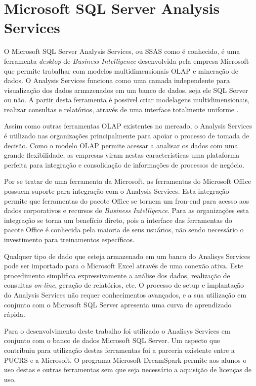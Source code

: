 \section{Microsoft SQL Server Analysis Services}
O Microsoft SQL Server Analysis Services, ou SSAS como é conhecido, é uma ferramenta \emph{desktop} de \emph{Business Intelligence} desenvolvida pela empresa Microsoft que permite trabalhar com modelos multidimensionais OLAP e mineração de dados. O Analysis Services funciona como uma camada independente para visualização dos dados armazenados em um banco de dados, seja ele SQL Server ou não. A partir desta ferramenta é possivel criar modelagens multidimensionais, realizar consultas e relatórios, através de uma interface totalmente uniforme \cite{MIC13}.

Assim como outras ferramentas OLAP existentes no mercado, o Analysis Services é utilizado nas organizações principalmente para apoiar o processo de tomada de decisão. Como o modelo OLAP permite acessar a analisar os dados com uma grande flexibilidade, as empresas viram nestas características uma plataforma perfeita para integração e consolidação de informações de processos de negócio.

Por se tratar de uma ferramenta da Microsoft, as ferramentas do Microsoft Office possuem suporte para integração com o Analysis Services. Esta integração permite que ferramentas do pacote Office se tornem um fron-end para acesso aos dados corporativos e recursos de \emph{Business Intelligence}. Para as organizações esta integração se torna um benefício direto, pois a interface das ferramentas do pacote Office é conhecida pela maioria de seus usuários, não sendo necessário o investimento para treinamentos específicos.

Qualquer tipo de dado que esteja armazenado em um banco do Analisys Services pode ser importado para o Microsoft Excel através de uma conexão ativa. Este procedimento simplifica expressivamente a análise dos dados, realização de consultas \emph{on-line}, geração de relatórios, etc. O processo de setup e implantação do Analysis Services não requer conhecimentos avançados, e a sua utilização em conjunto com o Microsoft SQL Server apresenta uma curva de aprendizado rápida.

Para o desenvolvimento deste trabalho foi utilizado o Analisys Services em conjunto com o banco de dados Microsoft SQL Server. Um aspecto que contribuiu para utilização destas ferramentas foi a parceria existente entre a PUCRS e a Microsoft. O programa Microsoft DreamSpark permite aos alunos o uso destas e outras ferramentas sem que seja necessário a aquisição de licenças de uso.






